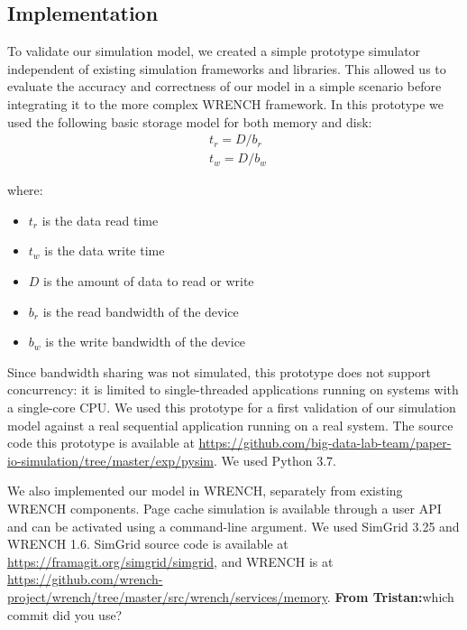 \documentclass[conference]{IEEEtran}
\newcommand{\tristan}[1]{\color{orange}\textbf{From Tristan:}#1\color{black}}
\begin{document}
        \subsection{Implementation}

            To validate our simulation model, we created a simple prototype
            simulator independent of existing simulation frameworks and libraries. 
            This allowed us to evaluate the accuracy and correctness of our 
            model in a simple scenario before integrating it to the more complex 
            WRENCH framework. 
            In this prototype we used the following basic storage model for 
            both memory and disk: 
            \begin{align*}
                & t_{r} = D / b_r \\ 
                & t_{w} = D / b_w\
            \end{align*}        
            
            where:
            \begin{itemize}
                \item $t_{r}$ is the data read time
                \item $t_{w}$ is the data write time
                \item $D$ is the amount of data to read or write
                \item $b_r$ is the read bandwidth of the device
                \item $b_w$ is the write bandwidth of the device
            \end{itemize}

            Since bandwidth sharing was not simulated, this prototype does not support
            concurrency: it is limited to single-threaded applications running on systems
            with a single-core CPU. We used this prototype for a first validation of our simulation
            model against a real sequential application running on a real system.
            The source code this prototype is available at
            \url{https://github.com/big-data-lab-team/paper-io-simulation/tree/master/exp/pysim}. We used Python 3.7.

            We also implemented our model in WRENCH, separately from existing WRENCH components. 
            Page cache simulation is available through a user API and can be activated using a command-line argument.
            We used SimGrid 3.25 and WRENCH 1.6. SimGrid source code is available at \url{https://framagit.org/simgrid/simgrid},
            and WRENCH is at \url{https://github.com/wrench-project/wrench/tree/master/src/wrench/services/memory}.
            \tristan{which commit did you use?}
\end{document}

